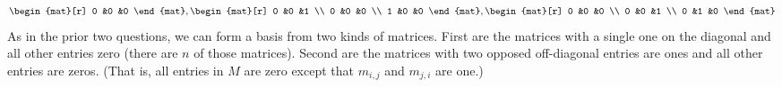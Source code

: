 \begin{Answer}
\begin{equation*}
{\begin{mat}[r]
                0  &0  &0
              \end{mat},
              \begin{mat}[r]
                0  &0  &1  \\
                0  &0  &0  \\
                1  &0  &0
              \end{mat},
              \begin{mat}[r]
                0  &0  &0  \\
                0  &0  &1  \\
                0  &1  &0
              \end{mat}  }
          \end{equation*}
         \Question As in the prior two questions, we can form a basis from two
           kinds of  matrices.
           First are the matrices with a single one on the diagonal and all
           other entries zero (there are \( n \) of those matrices).
           Second are the matrices with two opposed off-diagonal entries
           are ones and all other entries are zeros.
           (That is, all entries in $M$ are zero except that 
           $m_{i,j}$ and $m_{j,i}$ are one.) 

\end{Answer}
